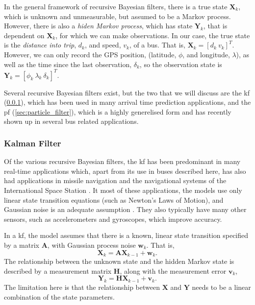 \documentclass[12pt,a4paper]{article}
\newcommand{\bY}{\mathbf{Y}}
\newcommand{\bX}{\mathbf{X}}
\newcommand{\mat}[1]{\mathbf{#1}}
\begin{document}
In the general framework of recursive Bayesian filters,
there is a true state $\bX_k$, which is unknown and unmeasurable,
but assumed to be a Markov process.
However, there is also a \emph{hiden Markov process},
which has state $\bY_k$, that is dependent on $\bX_k$, 
for which we can make observations.
In our case, the true state is the \emph{distance into trip}, $d_k$, 
and speed, $v_k$, of a bus.
That is, $\bX_k = [d_k\ v_k]^T$.
However, we can only record the GPS position, 
(latitude, $\phi$, and longitude, $\lambda$), 
as well as the time since the last observation, $\delta_k$,
so the observation state is $\bY_k = [\phi_k\ \lambda_k\ \delta_k]^T$.


Several recursive Bayesian filters exist,
but the two that we will discuss are the \gls{kf} (\cref{sec:kalman_filter}),
which has been used in many arrival time prediction applications,
and the \gls{pf} (\cref{sec:particle_filter}), 
which is a highly generelised form and has recently
shown up in several bus related applications.



\subsubsection{Kalman Filter}
\label{sec:kalman_filter}

Of the various recursive Bayesian filters, the \gls{kf} has been predominant in 
many real-time applications which, apart from its use in buses described here,
has also had applications in missile navigation and the navigational systems
of the International Space Station
\citep{cn}.
It most of these applications, the models use only
linear state transition equations (such as Newton's Laws of Motion),
and Gaussian noise is an adequate assumption \citep{cn}.
They also typically have many other sensors, such as accelerometers and
gyroscopes, which improve accuracy.


In a \gls{kf}, the model assumes that there is a known, linear state transition specified by
a matrix $\mat{A}$, with Gaussian process noise $\mat{w}_k$.
That is, 
\begin{equation}
  \label{eq:kf_statetransition}
  \bX_k = \mat{A}\bX_{k-1} + \mat{w}_k.
\end{equation}
The relationship between the unknown state and the hidden Markov state is described
by a measurement matrix $\mat{H}$, along with the measurement error $\mat{v}_k$,
\begin{equation}
  \label{eq:kf_measurement}
  \bY_k = \mat{H}\bX_{k-1} + \mat{v}_k.
\end{equation}
The limitation here is that the relationship between $\bX$ and $\bY$ needs to be a linear
combination of the state parameters.
\end{document}
